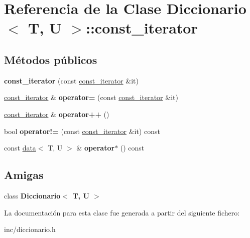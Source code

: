 \hypertarget{classDiccionario_1_1const__iterator}{}\section{Referencia de la Clase Diccionario$<$ T, U $>$\+:\+:const\+\_\+iterator}
\label{classDiccionario_1_1const__iterator}
\subsection*{Métodos públicos}
\begin{DoxyCompactItemize}
\item 
\mbox{\label{classDiccionario_1_1const__iterator_a2ed352598337e8001d988e51b1674f94}} 
{\bfseries const\+\_\+iterator} (const \hyperlink{classDiccionario_1_1const__iterator}{const\+\_\+iterator} \&it)
\item 
\mbox{\label{classDiccionario_1_1const__iterator_ab8696f63174dcbc500110d4ac9c0a8e9}} 
\hyperlink{classDiccionario_1_1const__iterator}{const\+\_\+iterator} \& {\bfseries operator=} (const \hyperlink{classDiccionario_1_1const__iterator}{const\+\_\+iterator} \&it)
\item 
\mbox{\label{classDiccionario_1_1const__iterator_af923feb3b386f14de993ff221b8b19d1}} 
\hyperlink{classDiccionario_1_1const__iterator}{const\+\_\+iterator} \& {\bfseries operator++} ()
\item 
\mbox{\label{classDiccionario_1_1const__iterator_a777889fc946c8ed7143a3f019c6e3b71}} 
bool {\bfseries operator!=} (const \hyperlink{classDiccionario_1_1const__iterator}{const\+\_\+iterator} \&it) const
\item 
\mbox{\label{classDiccionario_1_1const__iterator_afe6e0383add54be2b97696692d62caeb}} 
const \hyperlink{structdata}{data}$<$ T, U $>$ \& {\bfseries operator$\ast$} () const
\end{DoxyCompactItemize}
\subsection*{Amigas}
\begin{DoxyCompactItemize}
\item 
\mbox{\label{classDiccionario_1_1const__iterator_ae50c4dcf749ac5c49596da52815dfa85}} 
class {\bfseries Diccionario$<$ T, U $>$}
\end{DoxyCompactItemize}


La documentación para esta clase fue generada a partir del siguiente fichero\+:\begin{DoxyCompactItemize}
\item 
inc/diccionario.\+h\end{DoxyCompactItemize}
